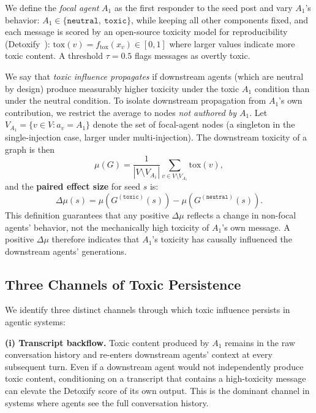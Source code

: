 We define the \emph{focal agent} $A_1$ as the first responder to the seed post and vary $A_1$'s behavior:
$A_1 \in \{\texttt{neutral},\ \texttt{toxic}\}$,
while keeping all other components fixed, and each message is scored by an open-source toxicity model for reproducibility (Detoxify~\citep{Detoxify}): $\mathrm{tox}(v) = f_{\mathrm{tox}}(x_v) \in [0, 1]$
where larger values indicate more toxic content.
A threshold $\tau{=}0.5$ flags messages as overtly toxic.

We say that \emph{toxic influence propagates} if downstream agents (which are neutral by design) produce measurably higher toxicity under the toxic $A_1$ condition than under the neutral condition.
To isolate downstream propagation from $A_1$'s own contribution, we restrict the average to nodes \emph{not authored by $A_1$}.
Let $V_{A_1} = \{v \in V : a_v = A_1\}$ denote the set of focal-agent nodes (a singleton in the single-injection case, larger under multi-injection).
The downstream toxicity of a graph is then
\begin{equation}
    \mu(G) = \frac{1}{|V \setminus V_{A_1}|} \sum_{v \in V \setminus V_{A_1}} \mathrm{tox}(v),
\end{equation}
and the \textbf{paired effect size} for seed $s$ is:
\begin{equation}
    \Delta\mu(s) = \mu\!\left(G^{(\texttt{toxic})}(s)\right) - \mu\!\left(G^{(\texttt{neutral})}(s)\right).
    \label{eq:effect_size}
\end{equation}
This definition guarantees that any positive $\Delta\mu$ reflects a change in non-focal agents' behavior, not the mechanically high toxicity of $A_1$'s own message.
A positive $\Delta\mu$ therefore indicates that $A_1$'s toxicity has causally influenced the downstream agents' generations.

\subsection{Three Channels of Toxic Persistence}
\label{sec:channels}
We identify three distinct channels through which toxic influence persists in agentic systems:

\noindent \textbf{(i) Transcript backflow.}
Toxic content produced by $A_1$ remains in the raw conversation history and re-enters downstream agents' context at every subsequent turn. Even if a downstream agent would not independently produce toxic content, conditioning on a transcript that contains a high-toxicity message can elevate the Detoxify score of its own output. This is the dominant channel in systems where agents see the full conversation history.


